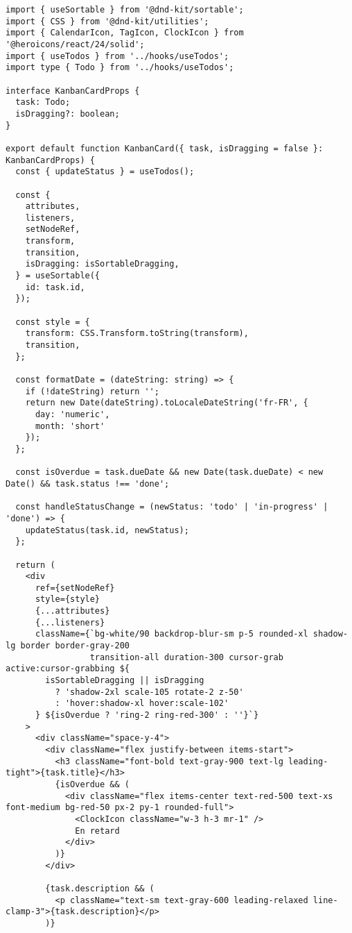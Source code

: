 \documentclass[12pt,a4paper]{article}
\begin{document}
\begin{lstlisting}[caption=KanbanCard.tsx - Carte de tache avec drag-and-drop (Tomas)]
import { useSortable } from '@dnd-kit/sortable';
import { CSS } from '@dnd-kit/utilities';
import { CalendarIcon, TagIcon, ClockIcon } from '@heroicons/react/24/solid';
import { useTodos } from '../hooks/useTodos';
import type { Todo } from '../hooks/useTodos';

interface KanbanCardProps {
  task: Todo;
  isDragging?: boolean;
}

export default function KanbanCard({ task, isDragging = false }: KanbanCardProps) {
  const { updateStatus } = useTodos();
  
  const {
    attributes,
    listeners,
    setNodeRef,
    transform,
    transition,
    isDragging: isSortableDragging,
  } = useSortable({
    id: task.id,
  });

  const style = {
    transform: CSS.Transform.toString(transform),
    transition,
  };

  const formatDate = (dateString: string) => {
    if (!dateString) return '';
    return new Date(dateString).toLocaleDateString('fr-FR', {
      day: 'numeric',
      month: 'short'
    });
  };

  const isOverdue = task.dueDate && new Date(task.dueDate) < new Date() && task.status !== 'done';

  const handleStatusChange = (newStatus: 'todo' | 'in-progress' | 'done') => {
    updateStatus(task.id, newStatus);
  };

  return (
    <div
      ref={setNodeRef}
      style={style}
      {...attributes}
      {...listeners}
      className={`bg-white/90 backdrop-blur-sm p-5 rounded-xl shadow-lg border border-gray-200 
                 transition-all duration-300 cursor-grab active:cursor-grabbing ${
        isSortableDragging || isDragging 
          ? 'shadow-2xl scale-105 rotate-2 z-50' 
          : 'hover:shadow-xl hover:scale-102'
      } ${isOverdue ? 'ring-2 ring-red-300' : ''}`}
    >
      <div className="space-y-4">
        <div className="flex justify-between items-start">
          <h3 className="font-bold text-gray-900 text-lg leading-tight">{task.title}</h3>
          {isOverdue && (
            <div className="flex items-center text-red-500 text-xs font-medium bg-red-50 px-2 py-1 rounded-full">
              <ClockIcon className="w-3 h-3 mr-1" />
              En retard
            </div>
          )}
        </div>
        
        {task.description && (
          <p className="text-sm text-gray-600 leading-relaxed line-clamp-3">{task.description}</p>
        )}
        

\end{lstlisting}
\end{document}
